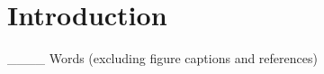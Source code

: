 \documentclass{physics_article_B}
\date{\today}
\begin{document}
\maketitle

\begin{abstract}

\end{abstract}

\section{Introduction}



\newpage
\printbibliography

____ Words (excluding figure captions and references)
\end{document}
